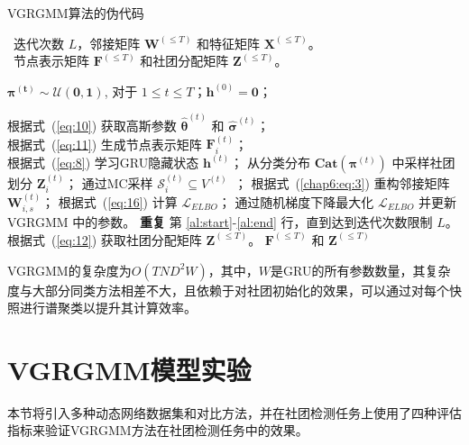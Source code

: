 \begin{algorithm}
	\caption{VGRGMM算法的伪代码} %
	\algorithmicrequire ~迭代次数 $L$，邻接矩阵 $\mathbf{W}^{(\le T)}$ 和特征矩阵 $\mathbf{X}^{(\le T)}$。\\
	\algorithmicensure ~节点表示矩阵 $\mathbf{F}^{(\le T)}$ 和社团分配矩阵 $\mathbf{Z}^{(\le T)}$。 \\
	\begin{algorithmic}[1]
		 $\bm{\pi^{(t)}} \sim \bm{\mathcal{U}(0,1)}$, 对于 $1 \le t \le T$；$ \mathbf{h}^{(0)}=\mathbf{0}$；
		 \label{al:start}
		
		\STATE 根据式~(\ref{eq:10}) 获取高斯参数 $\hat{\mathbf{\theta}}^{(t)}$ 和 $\hat{\mathbf{\sigma}}^{(t)}$； \label{al:enstart} \\
		\STATE 根据式~(\ref{eq:11}) 生成节点表示矩阵 $\mathbf{F}_i^{(t)}$； \label{al:enend} \\
		\STATE 根据式~(\ref{eq:8}) 学习GRU隐藏状态 $\mathbf{h}^{(t)}$； \label{al:ev}
		   \label{al:destart}
		\STATE 从分类分布 $\boldsymbol{Cat}(\bm{\pi}^{(t)})$ 中采样社团划分 $\mathbf{Z}_i^{(t)}$；
		\STATE 通过MC采样 $\mathcal{S}_i^{(t)} \subseteq V^{(t)}$~\cite{kingma2013auto}；
		\STATE 根据式~(\ref{chap6:eq:3}) 重构邻接矩阵 $\mathbf{W}_{i,s}^{(t)}$；
		\ENDFOR
		\ENDFOR 
		\ENDFOR \label{al:deend}
		\STATE 根据式~(\ref{eq:16}) 计算 $\mathcal{L}_{ELBO}$； \label{al:trstart}
		\STATE 通过随机梯度下降最大化 $\mathcal{L}_{ELBO}$ 并更新 VGRGMM 中的参数。\label{al:end} \label{al:trend}
		\STATE \textbf{重复} 第 \ref{al:start}-\ref{al:end} 行，直到达到迭代次数限制 $L$。
		\STATE 根据式~(\ref{eq:12}) 获取社团分配矩阵 $\mathbf{Z}^{(\le T)}$。 \label{al:ass}
		\RETURN $\mathbf{F}^{(\le T)}$ 和 $\mathbf{Z}^{(\le T)}$
		
	\end{algorithmic}
	\label{algorithm:chap6}
\end{algorithm}

VGRGMM的复杂度为$O(TND^2W)$，其中，$W$是GRU的所有参数数量，其复杂度与大部分同类方法相差不大，且依赖于对社团初始化的效果，可以通过对每个快照进行谱聚类以提升其计算效率。

\section{VGRGMM模型实验\label{chap6:experiment}}

本节将引入多种动态网络数据集和对比方法，并在社团检测任务上使用了四种评估指标来验证VGRGMM方法在社团检测任务中的效果。

